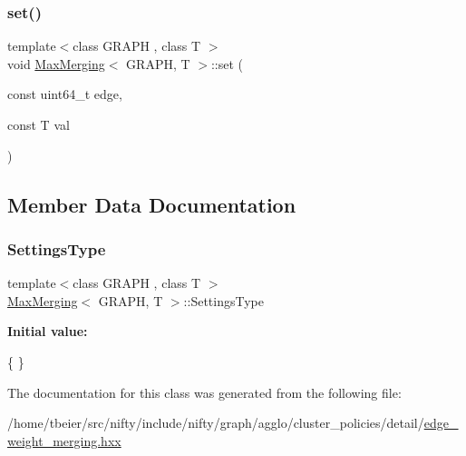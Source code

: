 \mbox{\label{classMaxMerging_a026a1b02b92cbc5dfae2252b5d149e79}} 
\subsubsection{\texorpdfstring{set()}{set()}}
{\footnotesize\ttfamily template$<$class G\+R\+A\+PH , class T $>$ \\
void \hyperlink{classMaxMerging}{Max\+Merging}$<$ G\+R\+A\+PH, T $>$\+::set (\begin{DoxyParamCaption}\item[{const uint64\+\_\+t}]{edge,  }\item[{const T}]{val }\end{DoxyParamCaption})\hspace{0.3cm}{\ttfamily [inline]}}



\subsection{Member Data Documentation}
\mbox{\label{classMaxMerging_aad2aed1692a3d6d3a0f2e940ea2907d8}} 
\subsubsection{\texorpdfstring{Settings\+Type}{SettingsType}}
{\footnotesize\ttfamily template$<$class G\+R\+A\+PH , class T $>$ \\
\hyperlink{classMaxMerging}{Max\+Merging}$<$ G\+R\+A\+PH, T $>$\+::Settings\+Type}

{\bfseries Initial value\+:}
\begin{DoxyCode}
\{
    \}
\end{DoxyCode}


The documentation for this class was generated from the following file\+:\begin{DoxyCompactItemize}
\item 
/home/tbeier/src/nifty/include/nifty/graph/agglo/cluster\+\_\+policies/detail/\hyperlink{edge__weight__merging_8hxx}{edge\+\_\+weight\+\_\+merging.\+hxx}\end{DoxyCompactItemize}
